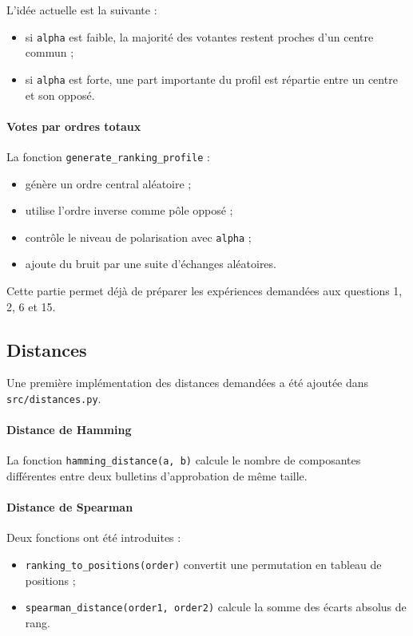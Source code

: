 \documentclass[11pt,a4paper]{article}
\begin{document}
L'id\'ee actuelle est la suivante :
\begin{itemize}[leftmargin=*]
    \item si \texttt{alpha} est faible, la majorit\'e des votantes restent proches d'un centre commun ;
    \item si \texttt{alpha} est forte, une part importante du profil est r\'epartie entre un centre et son oppos\'e.
\end{itemize}

\paragraph{Votes par ordres totaux}
La fonction \texttt{generate\_ranking\_profile} :
\begin{itemize}[leftmargin=*]
    \item g\'en\`ere un ordre central al\'eatoire ;
    \item utilise l'ordre inverse comme p\^ole oppos\'e ;
    \item contr\^ole le niveau de polarisation avec \texttt{alpha} ;
    \item ajoute du bruit par une suite d'\'echanges al\'eatoires.
\end{itemize}

Cette partie permet d\'ej\`a de pr\'eparer les exp\'eriences demand\'ees aux questions 1, 2, 6 et 15.

\subsection{Distances}

Une premi\`ere impl\'ementation des distances demand\'ees a \'et\'e ajout\'ee dans \texttt{src/distances.py}.

\paragraph{Distance de Hamming}
La fonction \texttt{hamming\_distance(a, b)} calcule le nombre de composantes diff\'erentes entre deux bulletins d'approbation de m\^eme taille.

\paragraph{Distance de Spearman}
Deux fonctions ont \'et\'e introduites :
\begin{itemize}[leftmargin=*]
    \item \texttt{ranking\_to\_positions(order)} convertit une permutation en tableau de positions ;
    \item \texttt{spearman\_distance(order1, order2)} calcule la somme des \'ecarts absolus de rang.
\end{itemize}
\end{document}
